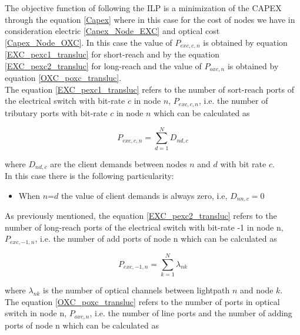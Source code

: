 \vspace{7pt}
The objective function of following the ILP is a minimization of the CAPEX through the equation \ref{Capex} where in this case for the cost of nodes we have in consideration electric \ref{Capex_Node_EXC} and optical cost \ref{Capex_Node_OXC}. In this case the value of $P_{exc,c,n}$ is obtained by equation \ref{EXC_pexc1_transluc} for short-reach and by the equation \ref{EXC_pexc2_transluc} for long-reach and the value of $P_{oxc,n}$ is obtained by equation \ref{OXC_poxc_transluc}.\\

The equation \ref{EXC_pexc1_transluc} refers to the number of sort-reach ports of the electrical switch with bit-rate $c$ in node $n$, $P_{exc,c,n}$, i.e. the number of tributary ports with bit-rate $c$ in node $n$ which can be calculated as

\begin{equation}
P_{exc,c,n} = \sum_{d=1}^{N} D_{nd,c}
\label{EXC_pexc1_transluc}
\end{equation}

\vspace{11pt}
\noindent
where $D_{nd,c}$ are the client demands between nodes $n$ and $d$ with bit rate $c$.\\

In this case there is the following particularity:
\begin{itemize}
  \item When $n$=$d$ the value of client demands is always zero, i.e, $D_{nn,c}=0$
\end{itemize}

\vspace{11pt}
As previously mentioned, the equation \ref{EXC_pexc2_transluc} refers to the number of long-reach ports of the electrical switch with bit-rate -1 in node n, $P_{exc,-1,n}$, i.e. the number of add ports of node n which can be calculated as

\begin{equation}
P_{exc,-1,n} = \sum_{k=1}^{N} \lambda_{nk}
\label{EXC_pexc2_transluc}
\end{equation}

\vspace{11pt}
\noindent
where $\lambda_{nk}$ is the number of optical channels between lightpath $n$ and node $k$.\\

The equation \ref{OXC_poxc_transluc} refers to the number of ports in optical switch in node n, $P_{oxc,n}$, i.e. the number of line ports and the number of adding ports of node n which can be calculated as


